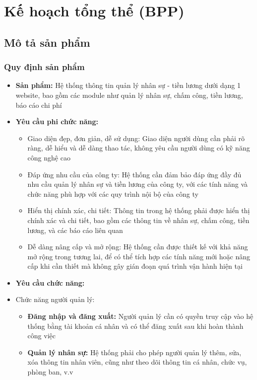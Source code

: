 \chapter{Kế hoạch tổng thể (BPP)}
\label{Chapter2}

\section{Mô tả sản phẩm}
\subsection{Quy định sản phẩm}
\begin{itemize}
    \item \textbf{Sản phẩm:} Hệ thống thông tin quản lý nhân sự - tiền lương dưới dạng 1 website, bao gồm các module như quản lý nhân sự, chấm công, tiền lương, báo cáo chi phí
    \item \textbf{Yêu cầu phi chức năng:}
    \begin{itemize}
        \item Giao diện đẹp, đơn giản, dễ sử dụng: Giao diện người dùng cần phải rõ ràng, dễ hiểu và dễ dàng thao tác, không yêu cầu người dùng có kỹ năng công nghệ cao
        \item Đáp ứng nhu cầu của công ty: Hệ thống cần đảm bảo đáp ứng đầy đủ nhu cầu quản lý nhân sự và tiền lương của công ty, với các tính năng và chức năng phù hợp với các quy trình nội bộ của công ty
        \item Hiển thị chính xác, chi tiết: Thông tin trong hệ thống phải được hiển thị chính xác và chi tiết, bao gồm các thông tin về nhân sự, chấm công, tiền lương, và các báo cáo liên quan
        \item Dễ dàng nâng cấp và mở rộng: Hệ thống cần được thiết kế với khả năng mở rộng trong tương lai, để có thể tích hợp các tính năng mới hoặc nâng cấp khi cần thiết mà không gây gián đoạn quá trình vận hành hiện tại
    \end{itemize}
    \item \textbf{Yêu cầu chức năng:}
    \item Chức năng người quản lý:
    \begin{itemize}
        \item \textbf{Đăng nhập và đăng xuất:} Người quản lý cần có quyền truy cập vào hệ thống bằng tài khoản cá nhân và có thể đăng xuất sau khi hoàn thành công việc
        \item \textbf{Quản lý nhân sự:} Hệ thống phải cho phép người quản lý thêm, sửa, xóa thông tin nhân viên, cũng như theo dõi thông tin cá nhân, chức vụ, phòng ban, v.v

\end{itemize}
\end{itemize}
